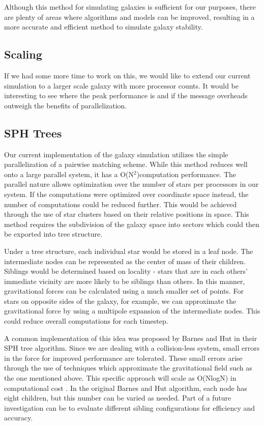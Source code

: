 \documentclass{article}
\begin{document}
Although this method for simulating galaxies is sufficient for our purposes, there are plenty of areas where algorithms and models can be improved, resulting in a more accurate and efficient method to simulate galaxy stability.

\subsection{Scaling}

If we had some more time to work on this, we would like to extend our current simulation to a larger scale galaxy with more processor counts.  It would be interesting to see where the peak performance is and if the message overheads outweigh the benefits of parallelization.

\subsection{SPH Trees}

Our current implementation of the galaxy simulation utilizes the simple parallelization of a pairwise matching scheme. While this method reduces well onto a large parallel system, it has a O(N$^2$)computation performance. The parallel nature allows optimization over the number of stars per processors in our system.  If the computations were optimized over coordinate space instead, the number of computations could be reduced further.  This would be achieved through the use of star clusters based on their relative positions in space. This method requires the subdivision of the galaxy space into sectors which could then be exported into tree structure.

Under a tree structure, each individual star would be stored in a leaf node.  The intermediate nodes can be represented as the center of mass of their children.  Siblings would be determined based on locality - stars that are in each others' immediate vicinity are more likely to be siblings than others.  In this manner, gravitational forces can be calculated using a much smaller set of points.  For stars on opposite sides of the galaxy, for example, we can approximate the gravitational force by using a multipole expansion of the intermediate nodes. This could reduce overall computations for each timestep.

A common implementation of this idea was proposed by Barnes and Hut in their SPH tree algorithm.  Since we are dealing with a collision-less system, small errors in the force for improved performance are tolerated.  These small errors arise through the use of techniques which approximate the gravitational field such as the one mentioned above.  This specific approach will scale as O(NlogN) in computational cost \cite{parallel-tree-code}.  In the original Barnes and Hut algorithm, each node has eight children, but this number can be varied as needed.  Part of a future investigation can be to evaluate different sibling configurations for efficiency and accuracy.
\end{document}
